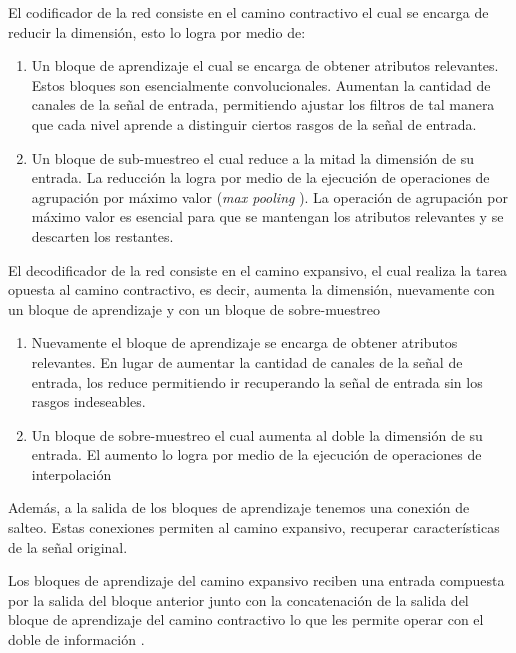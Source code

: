 El codificador de la red consiste en el camino contractivo el cual se encarga de reducir la dimensión, esto lo logra por medio de:

\begin{enumerate}
	\item Un bloque de aprendizaje el cual se encarga de obtener atributos relevantes. Estos bloques son esencialmente convolucionales. Aumentan la cantidad de canales de la señal de entrada, permitiendo ajustar los filtros de tal manera que cada nivel aprende a distinguir ciertos rasgos de la señal de entrada.
	
	\item Un bloque de sub-muestreo el cual reduce a la mitad la dimensión de su entrada. La reducción la logra por medio de la ejecución de operaciones de agrupación por máximo valor (\emph{max pooling} \cite{deep_learning}). La operación de agrupación por máximo valor es esencial para que se mantengan los atributos relevantes y se descarten los restantes.
\end{enumerate}

El decodificador de la red consiste en el camino expansivo, el cual realiza la tarea opuesta al camino contractivo, es decir, aumenta la dimensión, nuevamente con un bloque de aprendizaje y con un bloque de sobre-muestreo


\begin{enumerate}
	\item Nuevamente el bloque de aprendizaje se encarga de obtener atributos relevantes. En lugar de aumentar la cantidad de canales de la señal de entrada, los reduce permitiendo ir recuperando la señal de entrada sin los rasgos indeseables.
	
	\item Un bloque de sobre-muestreo el cual aumenta al doble la dimensión de su entrada. El aumento lo logra por medio de la ejecución de operaciones de interpolación
\end{enumerate}

Además, a la salida de los bloques de aprendizaje tenemos una conexión de salteo. Estas conexiones permiten al camino expansivo, recuperar características de la señal original. 

Los bloques de aprendizaje del camino expansivo reciben una entrada compuesta por la salida del bloque anterior junto con la concatenación de la salida del bloque de aprendizaje del camino contractivo lo que les permite operar con el doble de información \cite{the_importance_of_skip_connections_in_biomedical_image_segmentation}.

